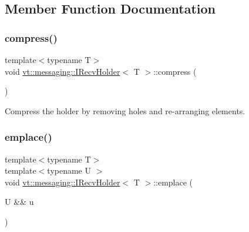 \subsection{Member Function Documentation}
\mbox{\label{structvt_1_1messaging_1_1_i_recv_holder_acfbf80c561c8aa8e75d27d2ee2892b09}} 
\subsubsection{\texorpdfstring{compress()}{compress()}}
{\footnotesize\ttfamily template$<$typename T$>$ \\
void \hyperlink{structvt_1_1messaging_1_1_i_recv_holder}{vt\+::messaging\+::\+I\+Recv\+Holder}$<$ T $>$\+::compress (\begin{DoxyParamCaption}{ }\end{DoxyParamCaption})\hspace{0.3cm}{\ttfamily [inline]}}



Compress the holder by removing holes and re-\/arranging elements. 

\mbox{\label{structvt_1_1messaging_1_1_i_recv_holder_ab81d251a84cb2c8366eb5f5052ce002c}} 
\subsubsection{\texorpdfstring{emplace()}{emplace()}}
{\footnotesize\ttfamily template$<$typename T$>$ \\
template$<$typename U $>$ \\
void \hyperlink{structvt_1_1messaging_1_1_i_recv_holder}{vt\+::messaging\+::\+I\+Recv\+Holder}$<$ T $>$\+::emplace (\begin{DoxyParamCaption}\item[{U \&\&}]{u }\end{DoxyParamCaption})\hspace{0.3cm}{\ttfamily [inline]}}



